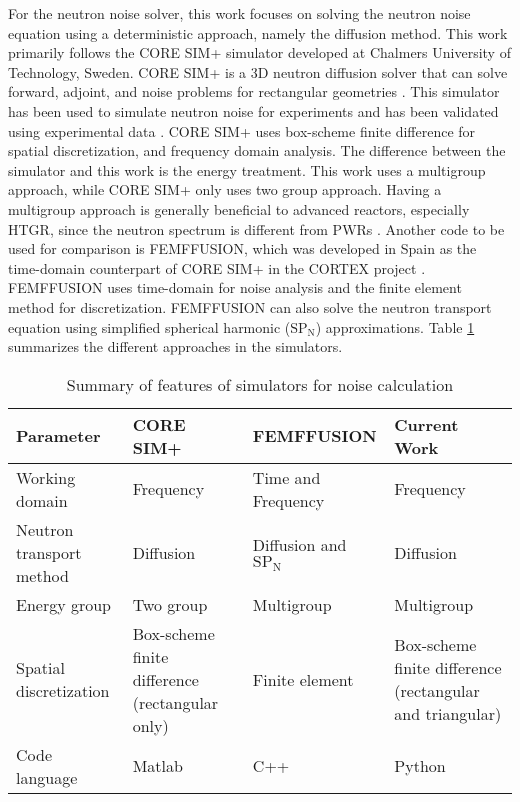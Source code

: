 For the neutron noise solver, this work focuses on solving the neutron noise equation using a deterministic approach, namely the diffusion method. This work primarily follows the CORE SIM+ simulator developed at Chalmers University of Technology, Sweden. CORE SIM+ is a 3D neutron diffusion solver that can solve forward, adjoint, and noise problems for rectangular geometries \cite{mylonakisCORESIMFlexible2021}. This simulator has been used to simulate neutron noise for experiments and has been validated using experimental data \cite{mylonakisCORESIMSIMULATIONS2021,hursinModelingNoiseExperiments2023}. CORE SIM+ uses box-scheme finite difference for spatial discretization, and frequency domain analysis. The difference between the simulator and this work is the energy treatment. This work uses a multigroup approach, while CORE SIM+ only uses two group approach. Having a multigroup approach is generally beneficial to advanced reactors, especially HTGR, since the neutron spectrum is different from PWRs \cite{ardiansyahEvaluationPBMR400Core2021}. Another code to be used for comparison is FEMFFUSION, which was developed in Spain as the time-domain counterpart of CORE SIM+ in the CORTEX project \cite{demaziereCORTEXProjectImproving2020}. FEMFFUSION uses time-domain for noise analysis and the finite element method for discretization. FEMFFUSION can also solve the neutron transport equation using simplified spherical harmonic ($\text{SP}_\text{N}$) approximations. Table \ref{table:other_works} summarizes the different approaches in the simulators.

\begin{table}[ht]
    \centering
    \caption{Summary of features of simulators for noise calculation}
    {\renewcommand{\arraystretch}{1.5}%
    \begin{tabular}{ | >{\raggedright\arraybackslash}m{3.0cm} | >{\centering\arraybackslash}m{3.5cm} |>{\centering\arraybackslash}m{3.0cm} | >{\centering\arraybackslash}m{3.5cm} | } 
     \hline
     \textbf{Parameter} & \textbf{CORE SIM+} & \textbf{FEMFFUSION}& \textbf{Current Work} \\ 
     \hline
     Working domain & Frequency &  Time and Frequency & Frequency \\ 
     \hline
     Neutron transport method & Diffusion & Diffusion and $\text{SP}_\text{N}$ & Diffusion\\ 
     \hline
     Energy group & Two group & Multigroup & Multigroup \\ 
     \hline
     Spatial discretization & Box-scheme finite difference (rectangular only) & Finite element & Box-scheme finite difference (rectangular and triangular) \\ 
     \hline
     Code language & Matlab & C++ & Python\\ 
     \hline
    \end{tabular}} \quad
    \label{table:other_works}
\end{table}

